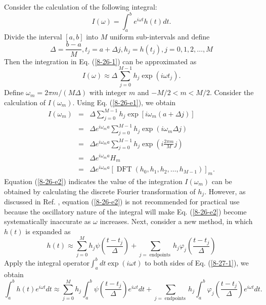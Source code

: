 \documentclass{article}
\newcommand{\tmop}[1]{\ensuremath{\operatorname{#1}}}
\begin{document}
Consider the calculation of the following integral:
\begin{equation}
  \label{8-26-1} I (\omega) = \int_a^b e^{i \omega t} h (t) d t.
\end{equation}
Divide the interval $[a, b]$ into $M$ uniform sub-intervals and define
\begin{equation}
  \Delta = \frac{b - a}{M}, t_j = a + \Delta j, h_j = h (t_j), j = 0, 1, 2,
  \ldots, M
\end{equation}
Then the integration in Eq. (\ref{8-26-1}) can be approximated as
\begin{equation}
  \label{8-26-e1} I (\omega) \approx \Delta \sum_{j = 0}^{M - 1} h_j \exp (i
  \omega t_j) .
\end{equation}
Define $\omega_m = 2 \pi m / (M \Delta)$ with integer $m$ and $- M / 2 < m < M
/ 2$. Consider the calculation of $I (\omega_m)$. Using Eq. (\ref{8-26-e1}),
we obtain
\begin{eqnarray}
  I (\omega_m) & = & \Delta \sum_{j = 0}^{M - 1} h_j \exp [i \omega_m (a +
  \Delta j)] \nonumber\\
  & = & \Delta e^{i \omega_m a} \sum_{j = 0}^{M - 1} h_j \exp (i \omega_m
  \Delta j) \nonumber\\
  & = & \Delta e^{i \omega_m a} \sum_{j = 0}^{M - 1} h_j \exp \left( i
  \frac{2 \pi m}{M} j \right) \nonumber\\
  & = & \Delta e^{i \omega_m a} H_m \\
  & = & \Delta e^{i \omega_m a} [\tmop{DFT} (h_0, h_1, h_2, \ldots, h_{M -
  1})]_m .  \label{8-26-e2}
\end{eqnarray}
Equation (\ref{8-26-e2}) indicates the value of the integration $I (\omega_m)$
can be obtained by calculating the discrete Fourier transformation of $h_j$.
However, as discussed in Ref. {\cite{press1992}}, equation (\ref{8-26-e2}) is
not recommended for practical use because the oscillatory nature of the
integral will make Eq. (\ref{8-26-e2}) become systematically inaccurate as
$\omega$ increases. Next, consider a new method, in which $h (t)$ is expanded
as
\begin{equation}
  \label{8-27-1} h (t) \approx \sum_{j = 0}^M h_j \psi \left( \frac{t -
  t_j}{\Delta} \right) + \sum_{j = \tmop{endpoints}} h_j \varphi_j \left(
  \frac{t - t_j}{\Delta} \right)
\end{equation}
Apply the integral operator$\int_a^b d t \exp (i \omega t)$ to both sides of
Eq. (\ref{8-27-1}), we obtain
\begin{equation}
  \int_a^b h (t) e^{i \omega t} d t \approx \sum_{j = 0}^M h_j \int_a^b \psi
  \left( \frac{t - t_j}{\Delta} \right) e^{i \omega t} d t + \sum_{j =
  \tmop{endpoints}} h_j \int_a^b \varphi_j \left( \frac{t - t_j}{\Delta}
  \right) e^{i \omega t} d t.
\end{equation}
\end{document}
